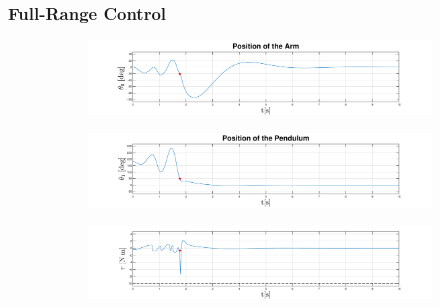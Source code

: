 \documentclass[]{beamer}
\begin{document}
\begin{frame}
	\frametitle{Full-Range Control}	
	\begin{figure}[H]
		\centering
		\begin{subfigure}
			\centering
			\includegraphics[scale=0.25]{images/Hswing/arm.pdf}  
		\end{subfigure}
		\begin{subfigure}
			\centering
			\includegraphics[scale=0.25]{images/Hswing/pend.pdf}  
		\end{subfigure}
		\begin{subfigure}
			\centering
			\includegraphics[scale=0.25]{images/Hswing/control.pdf} 
		\end{subfigure}
	\end{figure}
\end{frame}
\end{document}
